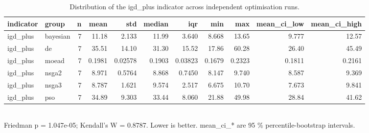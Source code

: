 \begin{table}[!t]
\centering
\caption{Distribution of the igd_plus indicator across independent optimisation runs.}
\label{tab:statistics_optimizer_igd_plus_main}
\footnotesize
\begin{tabular}{llrrrrrrrrr}
\toprule
indicator & group & n & mean & std & median & iqr & min & max & mean\_ci\_low & mean\_ci\_high \\
\midrule
igd\_plus & bayesian & 7 & 11.18 & 2.133 & 11.99 & 3.640 & 8.668 & 13.65 & 9.777 & 12.57 \\
igd\_plus & de & 7 & 35.51 & 14.10 & 31.30 & 15.52 & 17.86 & 60.28 & 26.40 & 45.49 \\
igd\_plus & moead & 7 & 0.1981 & 0.02578 & 0.1903 & 0.03823 & 0.1679 & 0.2323 & 0.1811 & 0.2161 \\
igd\_plus & nsga2 & 7 & 8.971 & 0.5764 & 8.868 & 0.7450 & 8.147 & 9.740 & 8.587 & 9.369 \\
igd\_plus & nsga3 & 7 & 8.787 & 1.621 & 9.574 & 2.517 & 6.675 & 10.70 & 7.673 & 9.841 \\
igd\_plus & pso & 7 & 34.89 & 9.303 & 33.44 & 8.060 & 21.88 & 49.98 & 28.84 & 41.62 \\
\bottomrule
\end{tabular}
\\[2pt] \footnotesize Friedman p = 1.047e-05; Kendall's W = 0.8787. Lower is better. mean\_ci\_* are 95 \% percentile-bootstrap intervals.
\end{table}
